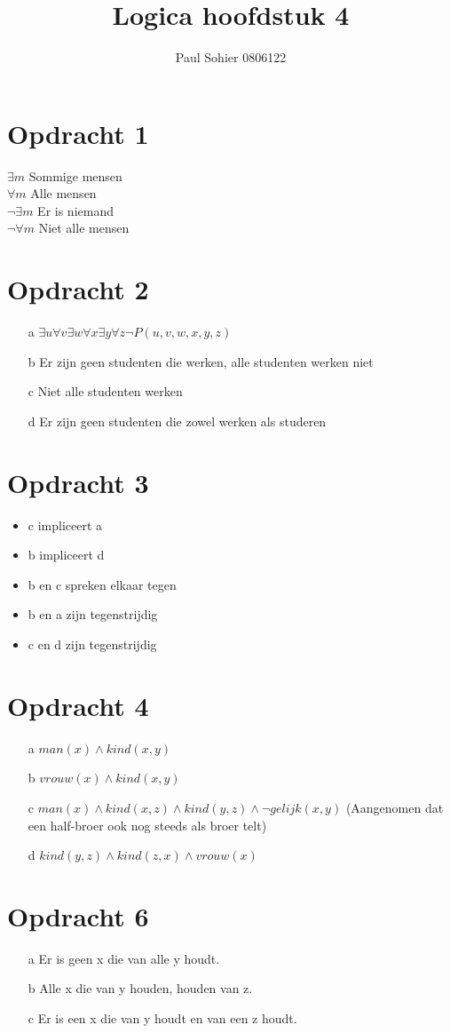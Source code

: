 \documentclass{artikel1}
\author{Paul Sohier 0806122}
\title{Logica hoofdstuk 4}
\begin{document}
\maketitle

\section{Opdracht 1}
$\exists m$ Sommige mensen\\
$\forall m$ Alle mensen\\
$\neg\exists m$ Er is niemand\\
$\neg\forall m$ Niet alle mensen\\
\section{Opdracht 2}
\begin{itemize}
\item[a] $\exists u \forall v \exists w \forall x \exists y \forall z \neg P (u,v,w,x,y,z)$
\item[b] Er zijn geen studenten die werken, alle studenten werken niet
\item[c] Niet alle studenten werken
\item[d] Er zijn geen studenten die zowel werken als studeren
\end{itemize}
\section{Opdracht 3}
\begin{itemize}
\item c impliceert a
\item b impliceert d
\item b en c spreken elkaar tegen
\item b en a zijn tegenstrijdig
\item c en d zijn tegenstrijdig
\end{itemize}
\section{Opdracht 4}
\begin{itemize}
\item[a]$man(x) \wedge kind(x,y)$
\item[b]$vrouw(x) \wedge kind(x,y)$
\item[c]$man(x) \wedge kind(x,z) \wedge kind(y,z) \wedge \neg gelijk(x,y)$ (Aangenomen dat een half-broer ook nog steeds als broer telt)
\item[d]$kind(y,z) \wedge kind(z,x) \wedge vrouw(x)$
\end{itemize}
\section{Opdracht 6}
\begin{itemize}
\item[a] Er is geen x die van alle y houdt.
\item[b] Alle x die van y houden, houden van z.
\item[c] Er is een x die van y houdt en van een z houdt.
\end{itemize}
\end{document}
